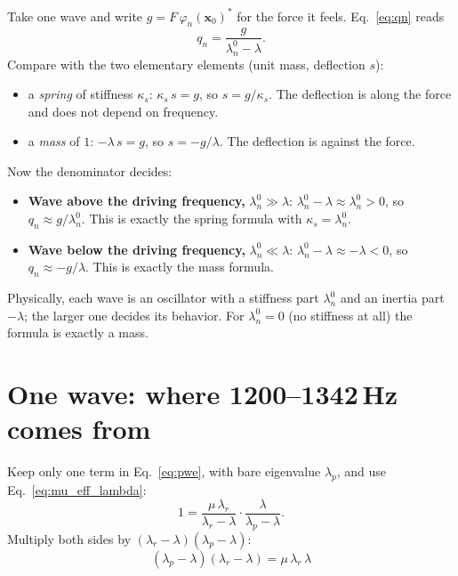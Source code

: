Take one wave and write $g = F\,\varphi_n(\mathbf{x}_0)^*$ for the force it
feels. Eq.~\eqref{eq:qn} reads
\begin{equation}
  q_n = \frac{g}{\lambda_n^0 - \lambda} .
\end{equation}
Compare with the two elementary elements (unit mass, deflection $s$):
\begin{itemize}
  \item a \emph{spring} of stiffness $\kappa_s$: $\kappa_s\, s = g$, so
        $s = g/\kappa_s$. The deflection is along the force and does not depend
        on frequency.
  \item a \emph{mass} of $1$: $-\lambda\, s = g$, so $s = -g/\lambda$. The
        deflection is against the force.
\end{itemize}
Now the denominator decides:
\begin{itemize}
  \item \textbf{Wave above the driving frequency,} $\lambda_n^0 \gg \lambda$:
        $\lambda_n^0 - \lambda \approx \lambda_n^0 > 0$, so
        $q_n \approx g/\lambda_n^0$. This is exactly the spring formula with
        $\kappa_s = \lambda_n^0$.
  \item \textbf{Wave below the driving frequency,} $\lambda_n^0 \ll \lambda$:
        $\lambda_n^0 - \lambda \approx -\lambda < 0$, so
        $q_n \approx -g/\lambda$. This is exactly the mass formula.
\end{itemize}
Physically, each wave is an oscillator with a stiffness part $\lambda_n^0$ and
an inertia part $-\lambda$; the larger one decides its behavior. For
$\lambda_n^0 = 0$ (no stiffness at all) the formula is exactly a mass.

\section{One wave: where 1200--1342\,Hz comes from}

Keep only one term in Eq.~\eqref{eq:pwe}, with bare eigenvalue $\lambda_p$, and
use Eq.~\eqref{eq:mu_eff_lambda}:
\begin{equation}
  1 = \frac{\mu\,\lambda_r}{\lambda_r - \lambda}\cdot\frac{\lambda}{\lambda_p - \lambda} .
\end{equation}
Multiply both sides by $(\lambda_r - \lambda)(\lambda_p - \lambda)$:
\begin{equation}
  \boxed{\;(\lambda_p - \lambda)(\lambda_r - \lambda) = \mu\,\lambda_r\,\lambda\;}
  \label{eq:one_wave}
\end{equation}

